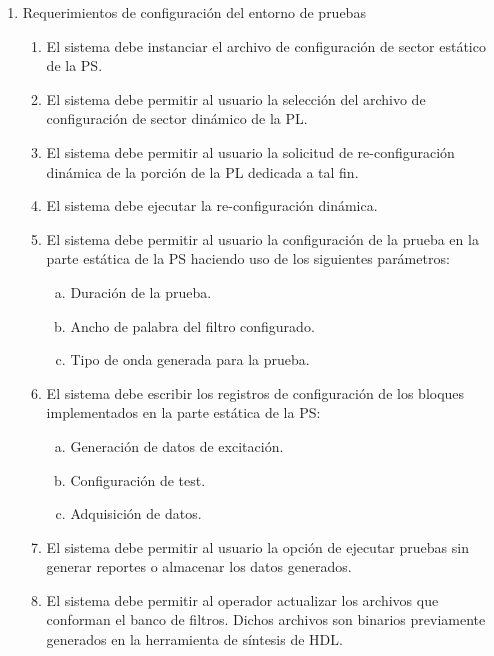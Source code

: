 \documentclass[
11pt, %
]{charter}
\begin{document}
\begin{enumerate}
	\item Requerimientos de configuración del entorno de pruebas
	\begin{enumerate}
		\item El sistema debe instanciar el archivo de configuración de sector estático de la PS.
		\item El sistema debe permitir al usuario la selección del archivo de configuración de sector dinámico de la PL.
		\item El sistema debe permitir al usuario la solicitud de re-configuración dinámica de la porción de la PL dedicada a tal fin.
		\item El sistema debe ejecutar la re-configuración dinámica.
		\item El sistema debe permitir al usuario la configuración de la prueba en la parte estática de la PS haciendo uso de los siguientes parámetros:
		\begin{enumerate}[a.]
			\item Duración de la prueba.
			\item Ancho de palabra del filtro configurado.
			\item Tipo de onda generada para la prueba.
		\end{enumerate}
		\item El sistema debe escribir los registros de configuración de los bloques implementados en la parte estática de la PS:
		 \begin{enumerate}[a.]
			\item Generación de datos de excitación.
			\item Configuración de test.
			\item Adquisición de datos.
		\end{enumerate}
		\item El sistema debe permitir al usuario la opción de ejecutar pruebas sin generar reportes o almacenar los datos generados. 
		\item El sistema debe permitir al operador actualizar los archivos que conforman el banco de filtros. Dichos archivos son binarios previamente generados en la herramienta de síntesis de HDL.	
	\end{enumerate}
	

\end{enumerate}
\end{document}
